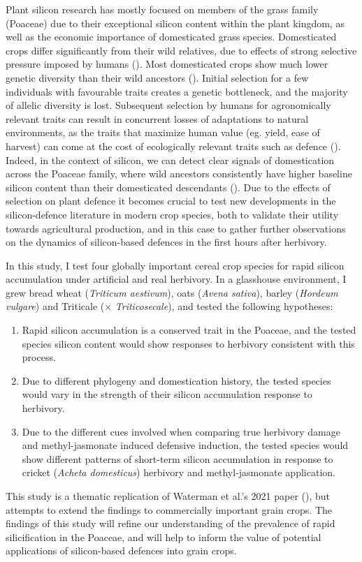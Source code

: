 \documentclass[12pt, letterpaper, ]{article}
\begin{document}
Plant silicon research has mostly focused on members of the grass family (Poaceae) due to their exceptional silicon content within the plant kingdom, as well as the economic importance of domesticated grass species. Domesticated crops differ significantly from their wild relatives, due to effects of strong selective pressure imposed by humans (\cite{chen_crop_2015}). Most domesticated crops show much lower genetic diversity than their wild ancestors (\cite{hafeez_creation_2021, smith_domestication_2019}). Initial selection for a few individuals with favourable traits creates a genetic bottleneck, and the majority of allelic diversity is lost. Subsequent selection by humans for agronomically relevant traits can result in concurrent losses of adaptations to natural environments, as the traits that maximize human value (eg. yield, ease of harvest) can come at the cost of ecologically relevant traits such as defence (\cite{whitehead_domestication_2017, chen_crop_2015}). Indeed, in the context of silicon, we can detect clear signals of domestication across the Poaceae family, where wild ancestors consistently have higher baseline silicon content than their domesticated descendants (\cite{simpson_still_2017}). Due to the effects of selection on plant defence it becomes crucial to test new developments in the silicon-defence literature in modern crop species, both to validate their utility towards agricultural production, and in this case to gather further observations on the dynamics of silicon-based defences in the first hours after herbivory.

In this study, I test four globally important cereal crop species for rapid silicon accumulation under artificial and real herbivory. In a glasshouse environment, I grew bread wheat (\textit{Triticum aestivum}), oats (\textit{Avena sativa}), barley (\textit{Hordeum vulgare}) and Triticale ($\times$ \textit{Triticosecale}), and tested the following hypotheses:
\begin{enumerate}
        \item Rapid silicon accumulation is a conserved trait in the Poaceae, and the tested species silicon content would show responses to herbivory consistent with this process.
        \item Due to different phylogeny and domestication history, the tested species would vary in the strength of their silicon accumulation response to herbivory. 
        \item Due to the different cues involved when comparing true herbivory damage and methyl-jasmonate induced defensive induction, the tested species would show different patterns of short-term silicon accumulation in response to cricket (\textit{Acheta domesticus}) herbivory and methyl-jasmonate application. 
\end{enumerate}
This study is a thematic replication of Waterman et al.’s 2021 paper (\cite{waterman_short-term_2021}), but attempts to extend the findings to commercially important grain crops. The findings of this study will refine our understanding of the prevalence of rapid silicification in the Poaceae, and will help to inform the value of potential applications of silicon-based defences into grain crops.
\end{document}
